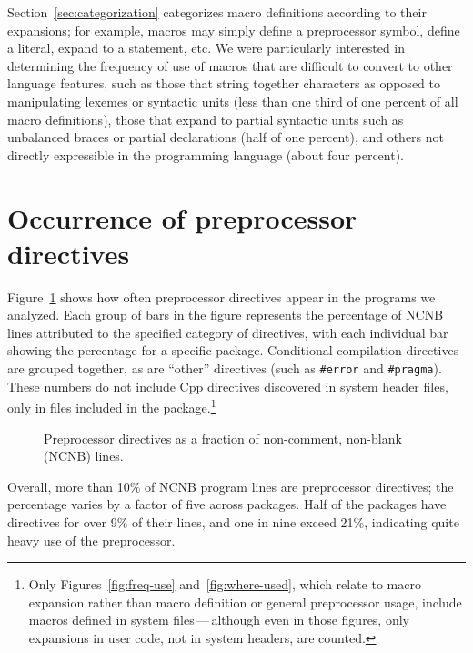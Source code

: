 \documentclass[11pt]{article}
\begin{document}
Section~\ref{sec:categorization} categorizes macro definitions according to
their expansions; for example, macros may simply define a preprocessor
symbol, define a literal, expand to a statement, etc.  We were particularly
interested in determining the frequency of use of macros that are difficult
to convert to other language features, such as those that string together
characters as opposed to manipulating lexemes or syntactic units (less than
one third of one percent of all macro definitions),
those that expand to partial syntactic units such as unbalanced
braces or partial declarations (half of one percent), and others not 
directly expressible in the programming language (about four percent).


\section{Occurrence of preprocessor directives}
\label{sec:directives}

Figure~\ref{fig:directives-breakdown} shows how often preprocessor
directives appear in the programs we analyzed.  Each group of bars in the
figure represents the percentage of NCNB lines attributed to the specified
category of directives, with each individual bar showing the percentage for
a specific package.  Conditional compilation directives are grouped together, as
are ``other'' directives (such as {\tt \#error} and {\tt \#pragma}).  These
numbers do not include Cpp directives discovered in system header files,
only in files included in the package.\footnote{Only
  Figures~\ref{fig:freq-use} and~\ref{fig:where-used}, which relate to
  macro expansion rather than macro definition or general preprocessor
  usage, include macros defined in system files\,---\,although even in those
  figures, only expansions in user code, not in system headers, are counted.}


\begin{figure}
\centerline{}
\caption{Preprocessor directives as a fraction of non-comment,
  non-blank (NCNB) lines.}
\label{fig:directives-breakdown}
\end{figure}

Overall, more than 10\% of NCNB program lines are preprocessor directives;
the percentage varies by a factor of five across packages.  Half of
the packages
have directives for over 9\% of their lines, and one in nine exceed 21\%,
indicating quite heavy use of the preprocessor.
\end{document}
